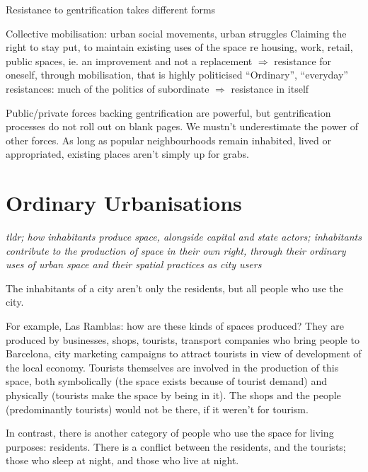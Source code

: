 \documentclass{article}
\begin{document}
Resistance to gentrification takes different forms
\begin{outline}
	\1 Collective mobilisation: urban social movements, urban struggles
	\1 Claiming the right to stay put, to maintain existing uses of the space re housing, work, retail, public spaces, ie. an improvement and not a replacement
	\1 
	\1 $\Rightarrow$ resistance for oneself, through mobilisation, that is highly politicised
	\1 ``Ordinary'', ``everyday'' resistances: much of the politics of subordinate
		\2 $\Rightarrow$ resistance in itself
\end{outline}

Public/private forces backing gentrification are powerful, but gentrification processes do not roll out on blank pages. We mustn't underestimate the power of other forces. As long as popular neighbourhoods remain inhabited, lived or appropriated, existing places aren't simply up for grabs.


\section{Ordinary Urbanisations}

\textit{tldr; how inhabitants produce space, alongside capital and state actors; inhabitants contribute to the production of space in their own right, through their ordinary uses of urban space and their spatial practices as city users}

The inhabitants of a city aren't only the residents, but all people who use the city. 

For example, Las Ramblas: how are these kinds of spaces produced? They are produced by businesses, shops, tourists, transport companies who bring people to Barcelona, city marketing campaigns to attract tourists in view of development of the local economy.
Tourists themselves are involved in the production of this space, both symbolically (the space exists because of tourist demand) and physically (tourists make the space by being in it). The shops and the people (predominantly tourists) would not be there, if it weren't for tourism.

In contrast, there is another category of people who use the space for living purposes: residents. There is a conflict between the residents, and the tourists; those who sleep at night, and those who live at night. 
\end{document}
